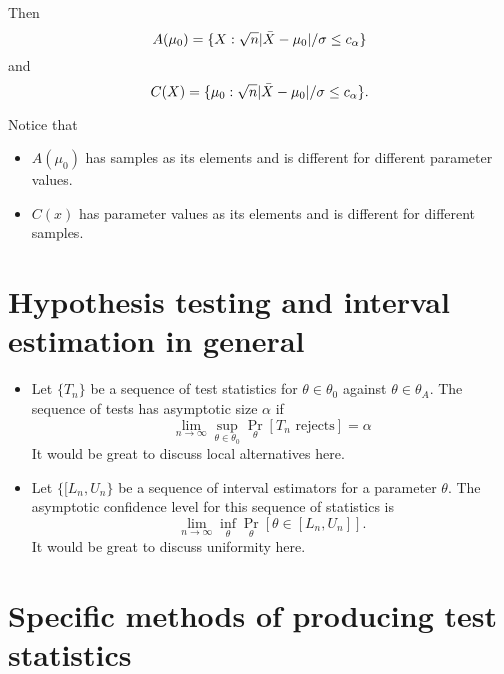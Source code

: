 \begin{itemize}[leftmargin=0pt]
\begin{ex}
    Then
    \begin{equation*}
      A(\mu_0) = \{X : \sqrt{n} |\bar{X} - \mu_0| / \sigma \leq c_\alpha\}
    \end{equation*}
    and
    \begin{equation*}
      C(X) = \{\mu_0 : \sqrt{n} |\bar{X} - \mu_0| / \sigma \leq c_\alpha\}.
    \end{equation*}
  \end{ex}

  Notice that
  \begin{itemize}
  \item $A(\mu_0)$ has samples as its elements and is different for
    different parameter values.
  \item $C(x)$ has parameter values as its elements and is different
    for different samples.
  \end{itemize}

\end{itemize}

\section{Hypothesis testing and interval estimation in general}

\begin{itemize}[leftmargin=0pt]

\item Let $\{T_n\}$ be a sequence of test statistics for $\theta \in \theta_0$
  against $\theta \in \theta_A$.  The sequence of tests has asymptotic size $\alpha$ if
  \begin{equation*}
    \lim_{n \to \infty} \sup_{\theta \in \theta_0} \Pr_\theta[T_n \text{ rejects}] = \alpha
  \end{equation*}
  It would be great to discuss local alternatives here.

\item Let $\{[L_n, U_n\}$ be a sequence of interval estimators for a
  parameter $\theta$.  The asymptotic confidence level for this sequence of
  statistics is
  \begin{equation*}
    \lim_{n \to \infty} \inf_\theta \Pr_{\theta}[\theta \in [L_n, U_n]].
  \end{equation*}
  It would be great to discuss uniformity here.

\end{itemize}

\section{Specific methods of producing test statistics}

